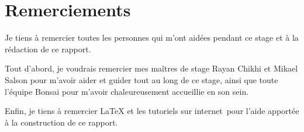 \section*{Remerciements}

Je tiens à remercier toutes les personnes qui m'ont aidées pendant ce stage et à la rédaction de ce rapport.

Tout d'abord, je voudrais remercier mes maîtres de stage Rayan Chikhi et Mikael Salson pour m'avoir aider et guider tout au long de ce stage, ainsi que toute l'équipe Bonsai pour m'avoir chaleureusement accueillie en son sein.

Enfin, je tiens à remercier \LaTeX{} et les tutoriels sur internet\,\footnotemark{} pour l'aide apportée à la construction de ce rapport.





%
